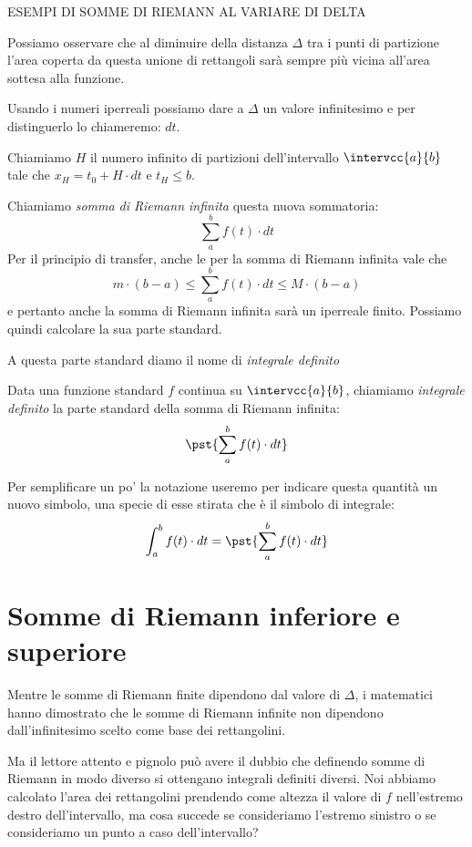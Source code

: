 ESEMPI DI SOMME DI RIEMANN AL VARIARE DI DELTA %

Possiamo osservare che al diminuire della distanza \(\Delta\) tra i punti di 
partizione l'area coperta da questa unione di rettangoli sarà sempre più 
vicina all'area sottesa alla funzione.

Usando i numeri iperreali possiamo dare a \(\Delta\) un valore infinitesimo e 
per distinguerlo lo chiameremo: \(dt\).

Chiamiamo \(H\) il numero infinito di partizioni dell'intervallo 
\(\intervcc{a}{b}\) tale che \(x_H = t_0 + H \cdot dt\) e \(t_H \le b\).

Chiamiamo \emph{somma di Riemann infinita} questa nuova sommatoria:
\[\sum_a^b f(t) \cdot dt\]
Per il principio di transfer, anche le per la somma di Riemann infinita vale 
che 
\[m \cdot (b - a) \le  \sum_a^b f(t) \cdot dt  \le M\cdot(b - a)\]
e pertanto anche la somma di Riemann infinita sarà un iperreale finito. 
Possiamo quindi calcolare la sua parte standard. 

A questa parte standard diamo il nome di \emph{integrale definito}
\begin{definizione}
Data una funzione standard \(f\) continua su \(\intervcc{a}{b}\),
chiamiamo \emph{integrale definito} la parte standard della 
somma di Riemann infinita:
\[\pst{\sum_a^b f(t) \cdot dt}\]
\end{definizione}

Per semplificare un po' la notazione useremo per indicare questa quantità un 
nuovo simbolo, una specie di esse stirata che è il simbolo di integrale:
\[\int_a^b f(t) \cdot dt = \pst{\sum_a^b f(t) \cdot dt}\]

\section{Somme di Riemann inferiore e superiore}
\label{sec:integrali_somme_riemann}

Mentre le somme di Riemann finite dipendono dal valore di \(\Delta\), i 
matematici hanno dimostrato che le somme di Riemann infinite non dipendono 
dall'infinitesimo scelto come base dei rettangolini.

Ma il lettore attento e pignolo può avere il dubbio che definendo somme di 
Riemann in modo diverso si ottengano integrali definiti diversi. Noi abbiamo 
calcolato l'area dei rettangolini prendendo come altezza il valore di \(f\) 
nell'estremo destro dell'intervallo, ma cosa succede se consideriamo 
l'estremo sinistro o se consideriamo un punto a caso dell'intervallo?


